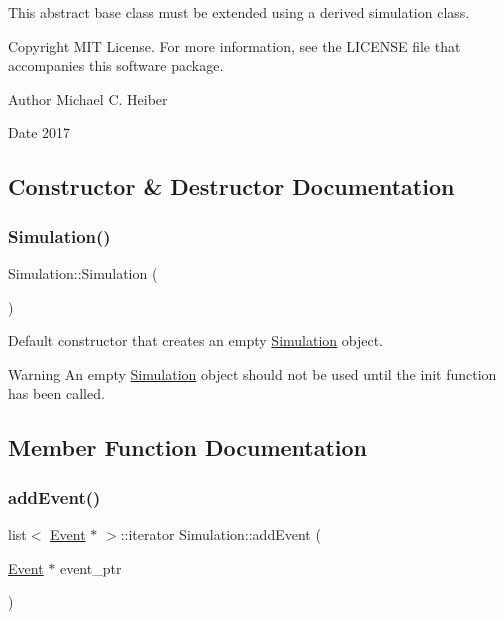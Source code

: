 This abstract base class must be extended using a derived simulation class. \begin{DoxyCopyright}{Copyright}
M\+IT License. For more information, see the L\+I\+C\+E\+N\+SE file that accompanies this software package. 
\end{DoxyCopyright}
\begin{DoxyAuthor}{Author}
Michael C. Heiber 
\end{DoxyAuthor}
\begin{DoxyDate}{Date}
2017 
\end{DoxyDate}


\subsection{Constructor \& Destructor Documentation}
\mbox{\label{class_simulation_a5b224cc5b36bcc8eb29689aff223de41}} 
\subsubsection{\texorpdfstring{Simulation()}{Simulation()}}
{\footnotesize\ttfamily Simulation\+::\+Simulation (\begin{DoxyParamCaption}{ }\end{DoxyParamCaption})}



Default constructor that creates an empty \hyperlink{class_simulation}{Simulation} object. 

\begin{DoxyWarning}{Warning}
An empty \hyperlink{class_simulation}{Simulation} object should not be used until the init function has been called. 
\end{DoxyWarning}


\subsection{Member Function Documentation}
\mbox{\label{class_simulation_a4b84249d359723e00ec4ae77164c8b7d}} 
\subsubsection{\texorpdfstring{add\+Event()}{addEvent()}}
{\footnotesize\ttfamily list$<$ \hyperlink{class_event}{Event} $\ast$ $>$\+::iterator Simulation\+::add\+Event (\begin{DoxyParamCaption}\item[{\hyperlink{class_event}{Event} $\ast$}]{event\+\_\+ptr }\end{DoxyParamCaption})\hspace{0.3cm}{\ttfamily [protected]}}



